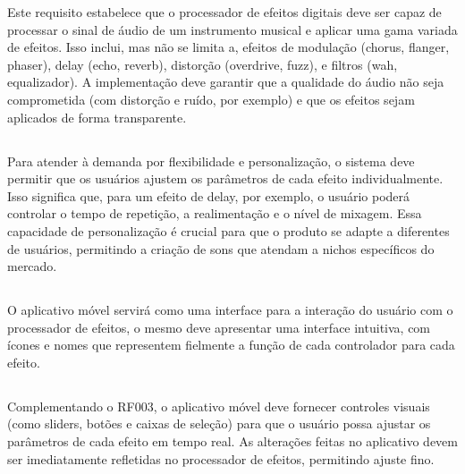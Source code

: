 Este requisito estabelece que o processador de efeitos digitais deve ser capaz de processar o sinal de áudio de um instrumento musical e aplicar uma gama variada de efeitos. Isso inclui, mas não se limita a, efeitos de modulação (chorus, flanger, phaser), delay (echo, reverb), distorção (overdrive, fuzz), e filtros (wah, equalizador). A implementação deve garantir que a qualidade do áudio não seja comprometida (com distorção e ruído, por exemplo) e que os efeitos sejam aplicados de forma transparente.

\subsection{}

Para atender à demanda por flexibilidade e personalização, o sistema deve permitir que os usuários ajustem os parâmetros de cada efeito individualmente. Isso significa que, para um efeito de delay, por exemplo, o usuário poderá controlar o tempo de repetição, a realimentação e o nível de mixagem. Essa capacidade de personalização é crucial para que o produto se adapte a diferentes de usuários, permitindo a criação de sons que atendam a nichos específicos do mercado.

\subsection{}

O aplicativo móvel servirá como uma interface para a interação do usuário com o processador de efeitos, o mesmo deve apresentar uma interface intuitiva, com ícones e nomes que representem fielmente a função de cada controlador para cada efeito.

\subsection{}

Complementando o RF003, o aplicativo móvel deve fornecer controles visuais (como sliders, botões e caixas de seleção) para que o usuário possa ajustar os parâmetros de cada efeito em tempo real. As alterações feitas no aplicativo devem ser imediatamente refletidas no processador de efeitos, permitindo ajuste fino.

\subsection{}

